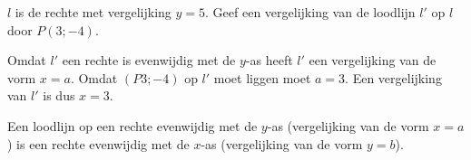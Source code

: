 \begin{voorbeeld}
	$l$ is de rechte met vergelijking $y=5$.
Geef een vergelijking van de loodlijn $l'$ op $l$ door $P(3;-4)$.

\begin{center}
\end{center}


Omdat $l'$ een rechte is evenwijdig met de $y$-as heeft $l'$ een vergelijking van de vorm $x=a$.
Omdat $(P3;-4)$ op $l'$ moet liggen moet $a=3$.
Een vergelijking van $l'$ is dus $x=3$.

Een loodlijn op een rechte evenwijdig met de $y$-as (vergelijking van de vorm $x=a$) is een rechte evenwijdig met de $x$-as (vergelijking van de vorm $y=b$).


\end{voorbeeld}
